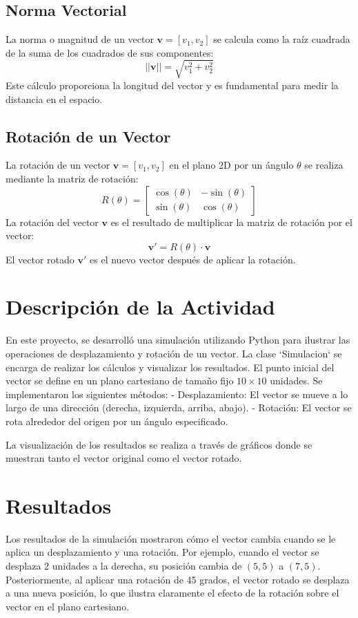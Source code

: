 \documentclass[a4paper, 10pt]{article}
\begin{document}
\subsection{Norma Vectorial}\label{s:2.2}
La norma o magnitud de un vector \( \mathbf{v} = [v_1, v_2] \) se calcula como la raíz cuadrada de la suma de los cuadrados de sus componentes:
\[
||\mathbf{v}|| = \sqrt{v_1^2 + v_2^2}
\]
Este cálculo proporciona la longitud del vector y es fundamental para medir la distancia en el espacio.

\subsection{Rotación de un Vector}\label{s:2.3}
La rotación de un vector \( \mathbf{v} = [v_1, v_2] \) en el plano 2D por un ángulo \( \theta \) se realiza mediante la matriz de rotación:
\[
R(\theta) = \begin{bmatrix} \cos(\theta) & -\sin(\theta) \\ \sin(\theta) & \cos(\theta) \end{bmatrix}
\]
La rotación del vector \( \mathbf{v} \) es el resultado de multiplicar la matriz de rotación por el vector:
\[
\mathbf{v'} = R(\theta) \cdot \mathbf{v}
\]
El vector rotado \( \mathbf{v'} \) es el nuevo vector después de aplicar la rotación.

\section{Descripción de la Actividad}\label{s:3}
En este proyecto, se desarrolló una simulación utilizando Python para ilustrar las operaciones de desplazamiento y rotación de un vector. La clase `Simulacion` se encarga de realizar los cálculos y visualizar los resultados. El punto inicial del vector se define en un plano cartesiano de tamaño fijo \( 10 \times 10 \) unidades. Se implementaron los siguientes métodos:
- Desplazamiento: El vector se mueve a lo largo de una dirección (derecha, izquierda, arriba, abajo).
- Rotación: El vector se rota alrededor del origen por un ángulo especificado.

La visualización de los resultados se realiza a través de gráficos donde se muestran tanto el vector original como el vector rotado.

\section{Resultados}\label{s:4}
Los resultados de la simulación mostraron cómo el vector cambia cuando se le aplica un desplazamiento y una rotación. Por ejemplo, cuando el vector se desplaza 2 unidades a la derecha, su posición cambia de \( (5, 5) \) a \( (7, 5) \). Posteriormente, al aplicar una rotación de 45 grados, el vector rotado se desplaza a una nueva posición, lo que ilustra claramente el efecto de la rotación sobre el vector en el plano cartesiano.
\end{document}
